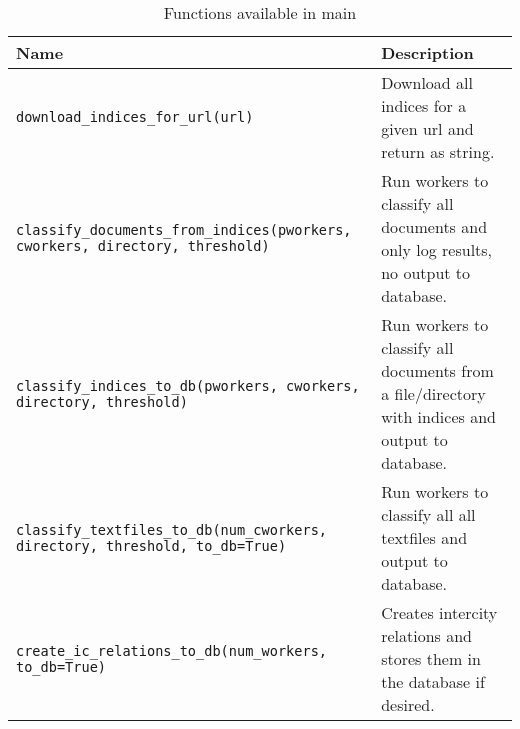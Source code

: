 \begin{table}[H]
\centering
\begin{tabular}{m{8cm} m{8cm}}
\textbf{Name}                     & \textbf{Description} \\\hline
\texttt{download\_indices\_for\_url(url)} & Download all indices for a given url and return as string. \\\hline

\texttt{classify\_documents\_from\_indices(pworkers, cworkers, directory, threshold)} & Run workers to classify all documents and only log results, no output to database.\\\hline

\texttt{classify\_indices\_to\_db(pworkers, cworkers, directory, threshold)} & Run workers to classify all documents from a file/directory with indices and output to database.\\\hline

\texttt{classify\_textfiles\_to\_db(num\_cworkers, directory, threshold, to\_db=True)} & Run workers to classify all all textfiles and output to database.\\\hline

\texttt{create\_ic\_relations\_to\_db(num\_workers, to\_db=True)} & Creates intercity relations and stores them in the database if desired. \\\hline 

\end{tabular}
\caption{Functions available in main}
\label{tbl:main-functions}
\end{table}